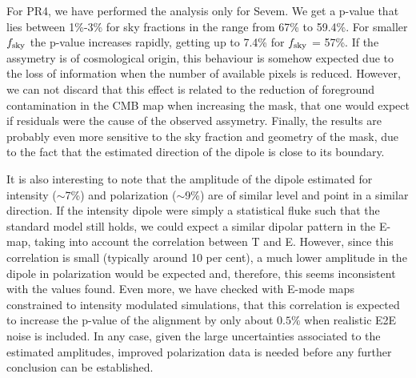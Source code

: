 For PR4, we have performed the analysis only for Sevem. We get a p-value that lies between 1\%-3\% for sky fractions in the range from 67\% to 59.4\%. For smaller $f_{\rm sky}$ the p-value increases rapidly, getting up to 7.4\% for $f_{\rm sky}$ = 57\%. If the assymetry is of cosmological origin, this behaviour is somehow expected due to the loss of information when the number of available pixels is reduced. 
However, we can not discard that this effect is related to the reduction of foreground contamination in the CMB map when increasing the mask, that one would expect if residuals were the cause of the observed assymetry. Finally, the results are probably even more sensitive to the sky fraction and geometry of the mask, due to the fact that the estimated direction of the dipole is close to its boundary.


It is also interesting to note that the amplitude of the dipole estimated for intensity ($\sim$7\%) and polarization ($\sim$9\%) are of similar level and point in a similar direction. If the intensity dipole were simply a statistical fluke such that the standard model still holds, we could expect a similar dipolar pattern
in the E-map, 
taking into account the correlation between T and E. 
However, since this correlation is small (typically around 10 per cent), a much lower amplitude in the dipole in polarization would be expected and, therefore, this seems inconsistent with the values found. Even more, we have checked with E-mode maps constrained to intensity modulated simulations, that this correlation is expected to increase the p-value of the alignment by only about $0.5\%$ when realistic E2E noise is included. In any case, given the large uncertainties associated to the estimated amplitudes, improved polarization data is needed before any further conclusion can be established.

